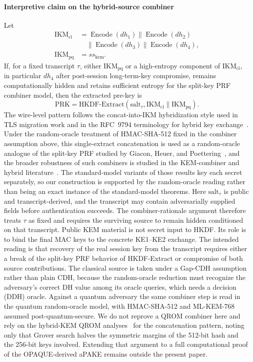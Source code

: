 \documentclass[preprint,12pt]{elsarticle}
\theoremstyle{remark}
\begin{document}
\paragraph{Interpretive claim on the hybrid-source combiner}
Let
\[
  \begin{aligned}
    \mathrm{IKM}_{\mathrm{cl}}
      &= \operatorname{Encode}(dh_1) \| \operatorname{Encode}(dh_2)\\
      &\quad \| \operatorname{Encode}(dh_3) \|
        \operatorname{Encode}(dh_4),\\
    \mathrm{IKM}_{\mathrm{pq}} &= ss_{\mathrm{kem}}.
  \end{aligned}
\]
If, for a fixed transcript $\tau$, either $\mathrm{IKM}_{\mathrm{pq}}$ or a
high-entropy component of $\mathrm{IKM}_{\mathrm{cl}}$, in particular $dh_4$
after post-session long-term-key compromise, remains computationally hidden and
retains sufficient entropy for the split-key PRF combiner model, then the
extracted pre-key is
\[
  \mathrm{PRK} =
  \mathrm{HKDF\text{-}Extract}(\mathrm{salt}_{\tau},
    \mathrm{IKM}_{\mathrm{cl}} \| \mathrm{IKM}_{\mathrm{pq}}).
\]
The wire-level pattern follows the concat-into-IKM hybridization style used
in TLS migration work and in the RFC~9794 terminology for hybrid key
exchange~\cite{stebila2024,rfc9794}. Under the random-oracle treatment of HMAC-SHA-512 fixed in the combiner
assumption above, this single-extract concatenation is used as a random-oracle
analogue of the split-key PRF studied by Giacon, Heuer, and Poettering~\cite{giacon2018}, and the broader
robustness of such combiners is studied in the KEM-combiner and hybrid
literature~\cite{giacon2018,bindel2019}. The standard-model variants of those
results key each secret separately, so our construction is supported by the
random-oracle reading rather than being an exact instance of the standard-model
theorems.
Here $\mathrm{salt}_{\tau}$ is public and transcript-derived, and the
transcript may contain adversarially supplied fields before authentication
succeeds. The combiner-rationale argument therefore treats $\tau$ as fixed
and requires the surviving source to remain hidden conditioned on that
transcript. Public KEM material is not secret input to HKDF. Its role is to
bind the final MAC keys to the concrete KE1--KE2 exchange. The intended
reading is that recovery of the real session key from the transcript
requires either a break of the split-key PRF behavior of HKDF-Extract or
compromise of both source contributions. The classical source is taken under a
Gap-CDH assumption rather than plain CDH, because the random-oracle reduction
must recognize the adversary's correct DH value among its oracle queries, which
needs a decision (DDH) oracle. Against a quantum adversary the same combiner step
is read in the quantum random-oracle model, with HMAC-SHA-512 and ML-KEM-768
assumed post-quantum-secure. We do not reprove a QROM combiner here and rely on
the hybrid-KEM QROM analyses~\cite{bindel2019} for the concatenation pattern,
noting only that Grover search halves the symmetric margins of the 512-bit hash
and the 256-bit keys involved. Extending
that argument to a full computational proof of the OPAQUE-derived aPAKE remains
outside the present paper.
\end{document}
